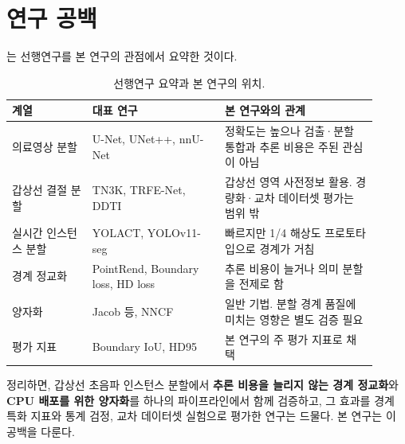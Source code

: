 \section{연구 공백}\label{sec:rw_gap}

는 선행연구를 본 연구의 관점에서 요약한 것이다.

\begin{table}[htbp]
\centering\small
\caption{선행연구 요약과 본 연구의 위치.}
\label{tab:related}
\begin{tabular}{p{0.2\linewidth}p{0.33\linewidth}p{0.38\linewidth}}
\toprule
계열 & 대표 연구 & 본 연구와의 관계 \\
\midrule
의료영상 분할 & U-Net\citep{ronneberger2015unet}, UNet++\citep{zhou2018unetpp}, nnU-Net\citep{isensee2021nnunet}
  & 정확도는 높으나 검출·분할 통합과 추론 비용은 주된 관심이 아님 \\
갑상선 결절 분할 & TN3K\citep{gong2021multitask}, TRFE-Net\citep{gong2023trfe}, DDTI\citep{pedraza2015ddti}
  & 갑상선 영역 사전정보 활용. 경량화·교차 데이터셋 평가는 범위 밖 \\
실시간 인스턴스 분할 & YOLACT\citep{bolya2019yolact}, YOLOv11-seg\citep{jocher2024yolo11}
  & 빠르지만 1/4 해상도 프로토타입으로 경계가 거침 \\
경계 정교화 & PointRend\citep{kirillov2020pointrend}, Boundary loss\citep{kervadec2019boundary}, HD loss\citep{karimi2020hausdorff}
  & 추론 비용이 늘거나 의미 분할을 전제로 함 \\
양자화 & Jacob 등\citep{jacob2018quantization}, NNCF\citep{kozlov2020nncf}
  & 일반 기법. 분할 경계 품질에 미치는 영향은 별도 검증 필요 \\
평가 지표 & Boundary IoU\citep{cheng2021boundaryiou}, HD95\citep{taha2015metrics}
  & 본 연구의 주 평가 지표로 채택 \\
\bottomrule
\end{tabular}
\end{table}

정리하면, 갑상선 초음파 인스턴스 분할에서 \textbf{추론 비용을 늘리지 않는 경계 정교화}와
\textbf{CPU 배포를 위한 양자화}를 하나의 파이프라인에서 함께 검증하고, 그 효과를 경계 특화 지표와
통계 검정, 교차 데이터셋 실험으로 평가한 연구는 드물다. 본 연구는 이 공백을 다룬다.
